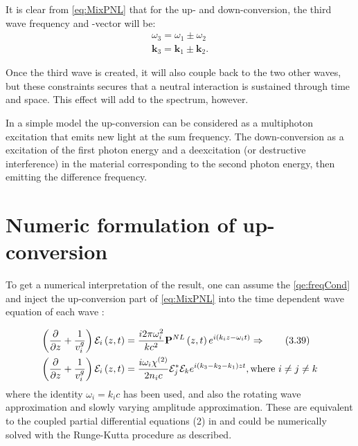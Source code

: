 It is clear from \cref{eq:MixPNL} that for the up- and down-conversion, the third wave frequency and -vector will be:
\begin{align}
  \label{qe:freqCond}
  \omega_3 = \omega_1 \pm \omega_2 \\
  \mathbf{k}_3 = \mathbf{k}_1 \pm \mathbf{k}_2.
\end{align}

Once the third wave is created, it will also couple back to
the two other waves, but these constraints secures that a neutral interaction is sustained through time and space.
This effect will add to the spectrum, however.

In a simple model the up-conversion can be considered as a multiphoton excitation that emits new light at the sum frequency. The down-conversion as a excitation of the first photon energy and a deexcitation (or destructive interference) in the material corresponding to the second photon energy, then emitting the difference frequency.



\section{Numeric formulation of up-conversion}
\label{sec:mixing-numeric}
 
To get a numerical interpretation of the result, one can assume the
\cref{qe:freqCond} and inject the up-conversion part of \cref{eq:MixPNL} into the time dependent wave equation of each wave \cite[Equation 3.39]{shen}:

\begin{align*}
\left( \frac{\partial }{\partial z}  + \frac{1}{v_i^{g}} \right) \mathcal{E}_i \left(z, t\right)
&= \frac{i 2 \pi \omega_i^{2}}{k c^2} \mathbf{P}^{NL} \left(z,t\right) e^{i \left(k_i z - \omega_{i}
    t\right)} \Rightarrow \tag{3.39}\\
\left( \frac{\partial }{\partial z}  + \frac{1}{v_i^{g}} \right) \mathcal{E}_i \left(z, t\right)
&= \frac{i \omega_i \chi^{(2)}}{2 n_i c} \mathcal{E}_j^{*}\mathcal{E}_k e^{i (k_3 - k_2 -k_1) z
  t}, \text{where } i \neq j \neq k \\
\end{align*}
where the identity $\omega_i = k_ic$ has been used, and also the rotating wave
approximation and slowly varying amplitude approximation. These are equivalent to
the coupled partial differential
equations  (2) in \cite{bakker} and could be numerically solved with the Runge-Kutta procedure
as described.

